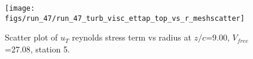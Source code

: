 \begin{figure}[H]
\centering
\texttt{[image: figs/run\_47/run\_47\_turb\_visc\_ettap\_top\_vs\_r\_meshscatter]}
\caption{Scatter plot of $
u_T$ reynolds stress term vs radius at $z/c$=9.00, $V_{free}$=27.08, station 5.}
\end{figure}


